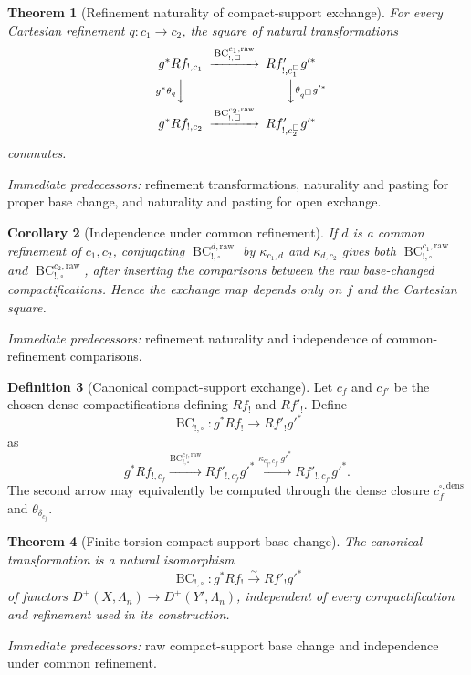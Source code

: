\documentclass[10pt]{article}
\newtheorem{theorem}{Theorem}[section]
\newtheorem{corollary}[theorem]{Corollary}
\theoremstyle{definition}
\newtheorem{definition}[theorem]{Definition}
\newcommand{\pred}[1]{\par\smallskip\begingroup\footnotesize\raggedright
\emph{Immediate predecessors:} #1.\par\endgroup}
\begin{document}
\begin{theorem}[Refinement naturality of compact-support exchange]
For every Cartesian refinement \(q:c_1\to c_2\), the square of natural
transformations
\[
\begin{CD}
 g^*Rf_{!,c_1}@>{\operatorname{BC}^{c_1,\mathrm{raw}}_{!,\square}}>>
 Rf'_{!,c^\square_1}g'^*\\
 @V{g^*\theta_q}VV @VV{\theta_{q^\square}g'^*}V\\
 g^*Rf_{!,c_2}@>{\operatorname{BC}^{c_2,\mathrm{raw}}_{!,\square}}>>
 Rf'_{!,c^\square_2}g'^*
\end{CD}
\]
commutes.
\end{theorem}
\pred{refinement transformations, naturality and pasting for proper base change, and naturality and pasting for open exchange}

\begin{corollary}[Independence under common refinement]
If \(d\) is a common refinement of \(c_1,c_2\), conjugating
\(\operatorname{BC}^{d,\mathrm{raw}}_{!,\square}\) by
\(\kappa_{c_1,d}\) and \(\kappa_{d,c_2}\) gives both
\(\operatorname{BC}^{c_1,\mathrm{raw}}_{!,\square}\) and
\(\operatorname{BC}^{c_2,\mathrm{raw}}_{!,\square}\), after inserting the
comparisons between the raw base-changed compactifications.  Hence the exchange map
depends only on \(f\) and the Cartesian square.
\end{corollary}
\pred{refinement naturality and independence of common-refinement comparisons}

\begin{definition}[Canonical compact-support exchange]
Let \(c_f\) and \(c_{f'}\) be the chosen dense compactifications defining
\(Rf_!\) and \(Rf'_!\).  Define
\[
 \operatorname{BC}_{!,\square}:
 g^*Rf_!\longrightarrow Rf'_!g'^*
\]
as
\[
 g^*Rf_{!,c_f}
 \xrightarrow{\operatorname{BC}^{c_f,\mathrm{raw}}_{!,\square}}
 Rf'_{!,c_f^\square}g'^*
 \xrightarrow{\kappa_{c_f^\square,c_{f'}}\,g'^*}
 Rf'_{!,c_{f'}}g'^*.
\]
The second arrow may equivalently be computed through the dense closure
\(c_f^{\square,\mathrm{dens}}\) and \(\theta_{\delta_{c_f}}\).
\end{definition}

\begin{theorem}[Finite-torsion compact-support base change]
The canonical transformation is a natural isomorphism
\[
 \operatorname{BC}_{!,\square}:
 g^*Rf_!\xrightarrow{\sim}Rf'_!g'^*
\]
of functors \(D^+(X,\Lambda_n)\to D^+(Y',\Lambda_n)\), independent of every
compactification and refinement used in its construction.
\end{theorem}
\pred{raw compact-support base change and independence under common refinement}
\end{document}
